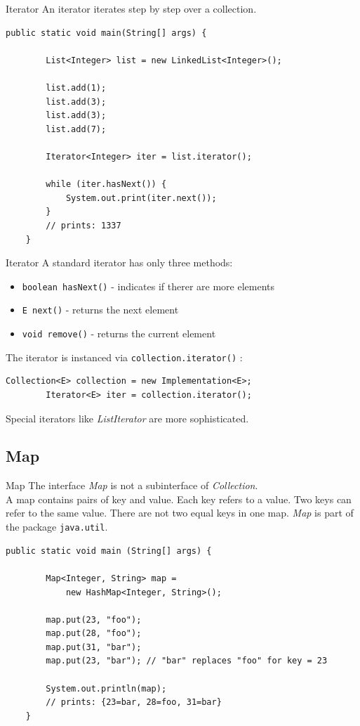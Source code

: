 \begin{frame}[fragile]{Iterator}
	An iterator iterates step by step over a collection.
	\begin{lstlisting}[basicstyle=\ttfamily\scriptsize]
	public static void main(String[] args) {
	
	    List<Integer> list = new LinkedList<Integer>();
	    
	    list.add(1);
	    list.add(3);
	    list.add(3);
	    list.add(7);
	    
	    Iterator<Integer> iter = list.iterator();
	    
	    while (iter.hasNext()) {
	        System.out.print(iter.next());
	    }
	    // prints: 1337
	}
	\end{lstlisting}
\end{frame}

\begin{frame}[fragile]{Iterator}
	A standard iterator has only three methods:
	\begin{itemize}
	\item \texttt{boolean hasNext()} - indicates if therer are more elements
	\item \texttt{E next()} - returns the next element
	\item \texttt{void remove()} - returns the current element
	\end{itemize}
	\vspace{1em}
	The iterator is instanced via \texttt{collection.iterator()} :
	\begin{lstlisting}[basicstyle=\ttfamily\scriptsize]
	    Collection<E> collection = new Implementation<E>;
	    Iterator<E> iter = collection.iterator();
	\end{lstlisting}
	Special iterators like \emph{ListIterator} are more sophisticated.
\end{frame}

\subsection{Map}
\begin{frame}[fragile]{Map}
	The interface \emph{Map} is not a subinterface of \emph{Collection}.\\
	A map contains pairs of key and value. Each key refers to a value. 
	Two keys can refer to the same value. There are not two equal keys in one map.
	\emph{Map} is part of the package \texttt{java.util}.
	\vfill
	\begin{lstlisting}[basicstyle=\ttfamily\scriptsize]
	public static void main (String[] args) {
	
	    Map<Integer, String> map = 
	        new HashMap<Integer, String>();
	    
	    map.put(23, "foo");
	    map.put(28, "foo");
	    map.put(31, "bar");
	    map.put(23, "bar"); // "bar" replaces "foo" for key = 23
	    
	    System.out.println(map);
	    // prints: {23=bar, 28=foo, 31=bar}
	}
	\end{lstlisting}
\end{frame}

